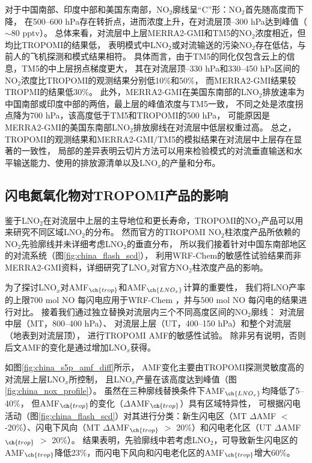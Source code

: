 对于中国南部、印度中部和美国东南部，NO$_2$廓线呈“C”形：NO$_2$首先随高度而下降，
在500--600 hPa存在转折点，进而浓度上升，在对流层顶--300 hPa达到峰值（$\sim$80 pptv）。
总体来看，对流层中上层MERRA2-GMI和TM5的NO$_2$浓度相近，但均比TROPOMI的结果低，
表明模式中LNO$_2$或对流输送的污染NO$_2$存在低估，与前人的飞机探测和模式结果相符\citep{Laughner.2019a}。
具体而言，由于TM5的同化仅包含云上的信息，TM5的中上层拐点梯度更大，
其在对流层顶--330 hPa和330--450 hPa区间的NO$_2$浓度比TROPOMI的观测结果分别低10\%和50\%，
而MERRA2-GMI结果较TROPMI的结果低30\%。
此外，MERRA2-GMI在美国东南部的LNO$_2$排放速率为中国南部或印度中部的两倍，最上层的峰值浓度与TM5一致，
不同之处是浓度拐点降为700 hPa，该高度低于TM5和TROPOMI的500 hPa，
可能原因是MERRA2-GMI的美国东南部LNO$_2$排放廓线在对流层中低层权重过高。
总之，TROPOMI的观测结果和MERRA2-GMI/TM5的模拟结果在对流层中上层存在显著的一致性，
局部的差异表明云切片方法可以用来检验模式的对流垂直输送和水平输送能力、使用的排放源清单以及LNO$_x$的产量和分布。


\subsection{闪电氮氧化物对TROPOMI产品的影响}  \label{sec:lnox_affects_tropomi}

鉴于LNO$_2$在对流层中上层的主导地位和更长寿命，TROPOMI的NO$_2$产品可以用来研究不同区域LNO$_2$的分布。
然而官方的TROPOMI NO$_2$柱浓度产品所依赖的NO$_2$先验廓线并未详细考虑LNO$_2$的垂直分布，
所以我们接着针对中国东南部地区的对流系统（图\ref{fig:china_flash_scd}），
利用WRF-Chem的敏感性试验结果而非MERRA2-GMI资料，详细研究了LNO$_x$对官方NO$_2$柱浓度产品的影响。

为了探讨LNO$_x$对AMF$_{\ch{trop}}$和AMF$_{\ch{LNO_x}}$计算的重要性，
我们将LNO产率的上限700 mol NO 每闪电\citep{Ott.2010}应用于WRF-Chem ，并与500 mol NO 每闪电的结果进行对比。
接着我们通过独立替换对流层内三个不同高度区间的NO$_2$廓线：
对流层中层（MT，800--400 hPa）、
对流层上层（UT，400--150 hPa）和整个对流层（地表到对流层顶），
进行TROPOMI AMF的敏感性试验。
除非另有说明，否则后文AMF的变化是通过增加LNO$_x$获得。

如图\ref{fig:china_s5p_amf_diff}所示，
AMF变化主要由TROPOMI探测灵敏度高的对流层上层LNO$_x$所控制\citep{Beirle.2009,Laughner.2017}，
且LNO$_x$产量在该高度达到峰值（图\ref{fig:china_nox_profile}）。
虽然在三种廓线替换条件下AMF$_{\ch{LNO_x}}$均降低了5--40\%，
但AMF$_{\ch{trop}}$的变化（$\Delta$AMF$_{\ch{trop}}$）具有区域特异性，
可根据闪电活动（图\ref{fig:china_flash_scd}）对其进行分类：新生闪电区（MT $\Delta$AMF $<$ -20\%）、闪电下风向（MT $\Delta$AMF$_{\ch{trop}}$ $>$ 20\%）和闪电老化区（UT $\Delta$AMF$_{\ch{trop}}$ $>$ 20\%）。
结果表明，先验廓线中若考虑LNO$_2$，可导致新生闪电区的AMF$_{\ch{trop}}$降低23\%，而闪电下风向和闪电老化区的AMF$_{\ch{trop}}$增大60\%。

